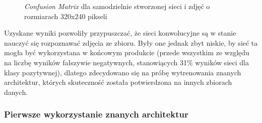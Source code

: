 \documentclass[polish,12pt]{aghthesis}
\begin{document}
\begin{figure}[h!]%
    \begin{adjustbox}{minipage=1.0\paperwidth, pagecenter}
    \centering
    \end{adjustbox}
    \label{fig:simple-arch-matrix}
    \caption{\textit{Confusion Matrix} dla samodzielnie stworzonej sieci i zdjęć o rozmiarach 320x240 pikseli}
\end{figure}

\par\noindent Uzyskane wyniki pozwoliły przypuszczać, że sieci konwolucyjne są w stanie nauczyć się rozpoznawać zdjęcia ze zbioru. Były one jednak zbyt niskie, by sieć ta mogła być wykorzystana w końcowym produkcie (przede wszystkim ze względu na liczbę wyników fałszywie negatywnych, stanowiących 31\% wyników sieci dla klasy pozytywnej), dlatego zdecydowano się na próbę wytrenowania znanych architektur, których skuteczność została potwierdzona na innych zbiorach danych.


\subsubsection{Pierwsze wykorzystanie znanych architektur}
\end{document}
